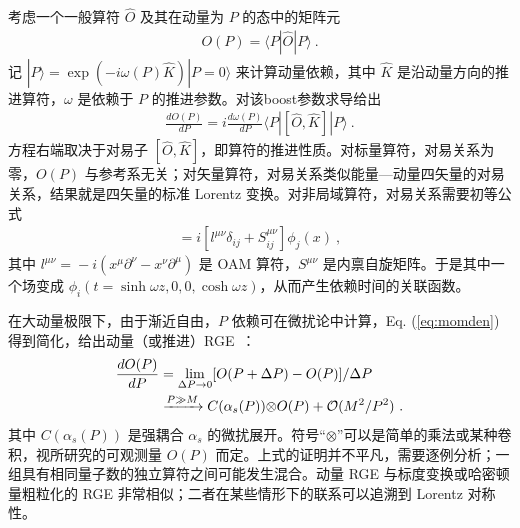 考虑一个一般算符 $\hat O$ 及其在动量为 $P$ 的态中的矩阵元
\begin{align}
	O(P) = \langle P|\hat O|P\rangle \ .
\end{align}
记 $|P\rangle
= \exp(-i\omega(P) \hat K)|P=0\rangle$ 来计算动量依赖，其中 $\hat K$ 是沿动量方向的推进算符，$\omega$ 是依赖于 $P$ 的推进参数。对该{boost}参数求导给出
\begin{align}
	\frac{d O(P)}{dP} = i\frac{d\omega(P)}{dP}\langle P|[\hat O,\hat K]|P\rangle \ .
	\label{eq:momden}
\end{align}
方程右端取决于对易子 $[\hat O,\hat K]$，即算符的推进性质。对标量算符，对易关系为零，$O(P)$ 与参考系无关；对矢量算符，对易关系类似能量—动量四矢量的对易关系，结果就是四矢量的标准 Lorentz 变换。对非局域算符，对易关系需要初等公式
\begin{align}
	[J^{\mu\nu}, \phi_i(x)] = i\left[l^{\mu\nu}\delta_{ij}+S^{\mu\nu}_{ij}\right]\phi_j(x)\ ,
\end{align}
其中 $l^{\mu\nu}\!=\!-i (x^{\mu}\partial^{\nu}\!-\!x^{\nu}\partial^{\mu})$ 是 OAM 算符，$S^{\mu\nu}$ 是内禀自旋矩阵。于是其中一个场变成 { $\phi_i(t=\sinh\omega z, 0, 0, \cosh\omega z)$}，从而产生依赖时间的关联函数。

在大动量极限下，由于渐近自由，$P$ 依赖可在微扰论中计算，Eq. (\ref{eq:momden}) 得到简化，给出动量（或推进）RGE~\cite{Ji:2014gla}：
\begin{align}
	\frac{d O(P)}{dP} &= \lim_{\Delta P\to 0}[O(P+\Delta P) - O(P)]/\Delta P \\
	&\xrightarrow{P\gg M} C(\alpha_s(P)){\otimes} O(P) + {\cal O} (M^2/P^2) \ .
\end{align}
其中 $C(\alpha_s(P))$ 是强耦合 $\alpha_s$ 的微扰展开。符号``$\otimes$''可以是简单的乘法或某种卷积，视所研究的可观测量 $O(P)$ 而定。上式的证明并不平凡，需要逐例分析；一组具有相同量子数的独立算符之间可能发生混合。动量 RGE 与标度变换或哈密顿量粗粒化的 RGE 非常相似；二者在某些情形下的联系可以追溯到 Lorentz 对称性。

